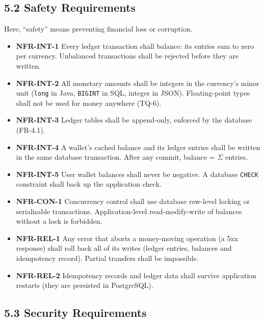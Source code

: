 \documentclass[11pt,a4paper]{article}
\providecommand{\tightlist}{\setlength{\itemsep}{2pt}\setlength{\parskip}{0pt}}
\begin{document}
\subsection{5.2 Safety Requirements}\label{safety-requirements}

Here, ``safety'' means preventing financial loss or corruption.

\begin{itemize}
\tightlist
\item
  \textbf{NFR-INT-1} Every ledger transaction shall balance: its entries sum to zero per currency.
  Unbalanced transactions shall be rejected before they are written.
\item
  \textbf{NFR-INT-2} All monetary amounts shall be integers in the currency's minor unit (\texttt{long} in
  Java, \texttt{BIGINT} in SQL, integer in JSON). Floating-point types shall not be used for money
  anywhere (TQ-6).
\item
  \textbf{NFR-INT-3} Ledger tables shall be append-only, enforced by the database (FR-4.1).
\item
  \textbf{NFR-INT-4} A wallet's cached balance and its ledger entries shall be written in the same
  database transaction. After any commit, balance = \ensuremath{\Sigma} entries.
\item
  \textbf{NFR-INT-5} User wallet balances shall never be negative. A database \texttt{CHECK} constraint shall
  back up the application check.
\item
  \textbf{NFR-CON-1} Concurrency control shall use database row-level locking or serialisable
  transactions. Application-level read-modify-write of balances without a lock is forbidden.
\item
  \textbf{NFR-REL-1} Any error that aborts a money-moving operation (a 5xx response) shall roll back all
  of its writes (ledger entries, balances and idempotency record). Partial transfers shall be
  impossible.
\item
  \textbf{NFR-REL-2} Idempotency records and ledger data shall survive application restarts (they are
  persisted in PostgreSQL).
\end{itemize}

\subsection{5.3 Security Requirements}\label{security-requirements}
\end{document}
